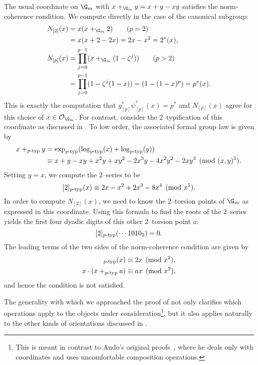 \begin{example}
The usual coordinate on \(\G_m\) with \(x +_{\G_m} y = x + y - xy\) satisfies the norm-coherence condition.  We compute directly in the case of the canonical subgroup:
\begin{align*}
N_{[2]}(x) & = x(x +_{\G_m} 2) \tag{\(p = 2\)} \\
& = x (x + 2 - 2x) = 2x - x^2 = 2^*(x), \\
N_{[p]}(x) & = \prod_{j=0}^{p-1} (x +_{\G_m} (1 - \zeta^j)) \tag{\(p > 2\)} \\
& = \prod_{j=0}^{p-1} (1 - \zeta^j(1 - x)) = (1 - (1 - x)^p) = p^*(x).
\end{align*}
This is exactly the computation that \(g_{[p]}^* \psi_{[p]}^*(x) = p^*\) and \(N_{[p]}(x)\) agree for this choice of \(x \in \sheaf O_{\G_m}\).
For contrast, consider the \(2\)--typification of this coordinate as discussed in .  To low order, the associated formal group law is given by
\begin{align*}
x +_{\mathit{p}\text{-}\mathrm{typ}} y & = \exp_{\mathit{p}\text{-}\mathrm{typ}}(\log_{\mathit{p}\text{-}\mathrm{typ}}(x) + \log_{\mathit{p}\text{-}\mathrm{typ}}(y)) \\
& \equiv x + y - x y + x^2 y + x y^2 - 2 x^3 y - 4 x^2 y^2 - 2 x y^3 \pmod{(x, y)^5}.
\end{align*}
Setting \(y = x\), we compute the \(2\)--series to be \[[2]_{\mathit{p}\text{-}\mathrm{typ}}(x) \equiv 2x - x^2 + 2x^3 - 8 x^4 \pmod{x^5}.\]  In order to compute \(N_{[2]}(x)\), we need to know the \(2\)--torsion points of \(\G_m\) as expressed in this coordinate.  Using this formula to find the roots of the \(2\)--series yields the first four dyadic digits of this other \(2\)--torsion point \(a\): \[[2]_{\mathit{p}\text{-}\mathrm{typ}}(\cdots 1010_2) = 0.\]  The leading terms of the two sides of the norm-coherence condition are given by
\begin{align*}
[2]_{\ptyp}(x) & \equiv 2x \pmod{x^2}, \\
x \cdot (x +_{\ptyp} a) & \equiv ax \pmod{x^2},
\end{align*}
and hence the condition is not satisfied.
\end{example}

The generality with which we approached the proof of  not only clarifies which operations apply to the objects under consideration\footnote{This is meant in contrast to Ando's original proofs~\cite[Section 2.6]{Ando}, where he deals only with coordinates and uses uncomfortable composition operations.}, but it also applies naturally to the other kinds of orientations discussed in .

